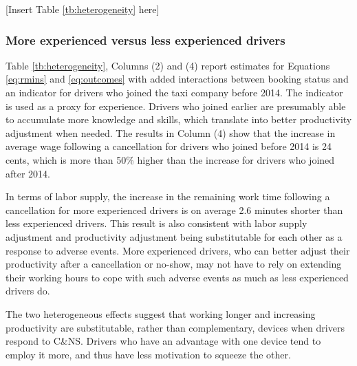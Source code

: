 \documentclass[reviewmode]{restat}
\begin{document}
\begin{center}
	[Insert Table \ref{tb:heterogeneity} here]
\end{center}


\subsubsection{More experienced versus less experienced drivers}

Table \ref{tb:heterogeneity}, Columns (2) and (4) report estimates for Equations \eqref{eq:rmins} and 
\eqref{eq:outcomes} with added interactions between booking status and an indicator for drivers who 
joined the taxi company before 2014. The indicator is used as a proxy for experience. Drivers who joined
earlier are presumably able to accumulate more knowledge and skills, which translate into better
productivity adjustment when needed. The results in Column (4) show that the increase in average wage 
following a cancellation for drivers who joined before 2014 is 24 cents, which is more than 50\% higher
than the increase for drivers who joined after 2014.

In terms of labor supply, the increase in the remaining work time following a cancellation for more 
experienced drivers is on average 2.6 minutes shorter than less experienced drivers. This result is also
consistent with labor supply adjustment and productivity adjustment being substitutable for each other as
a response to adverse events. More experienced drivers, who can better adjust their productivity after a 
cancellation or no-show, may not have to rely on extending their working hours to cope with such adverse 
events as much as less experienced drivers do.

The two heterogeneous effects suggest that working longer and increasing productivity are substitutable, 
rather than complementary, devices when drivers respond to C\&NS. Drivers who have an advantage with one 
device tend to employ it more, and thus have less motivation to squeeze the other.
\end{document}

